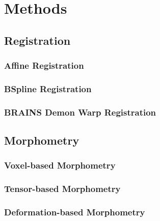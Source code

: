 \chapter{Methods}

\section{Registration}
\subsection{Affine Registration}
\subsection{BSpline Registration}
\subsection{BRAINS Demon Warp Registration}

\section{Morphometry}
\subsection{Voxel-based Morphometry}
\subsection{Tensor-based Morphometry}
\subsection{Deformation-based Morphometry}